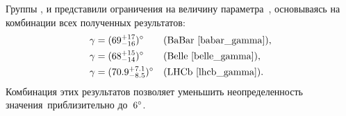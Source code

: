 Группы \babar, \belle и \lhcb представили ограничения на величину параметра~\gphi, основываясь на комбинации всех полученных результатов:
\begin{equation}
 \begin{aligned}
  \gamma &= (69^{+17}_{-16})^{\circ}     && (\mathrm{BaBar}~\text{\cite{babar_gamma}}), \\
  \gamma &= (68^{+15}_{-14})^{\circ}     && (\mathrm{Belle}~\text{\cite{belle_gamma}}), \\
  \gamma &= (70.9^{+7.1}_{-8.5})^{\circ} && (\mathrm{LHCb}~\text{\cite{lhcb_gamma}}). \\
 \end{aligned}
\end{equation}
Комбинация этих результатов позволяет уменьшить неопределенность значения~\gphi приблизительно до~$6^{\circ}$.

